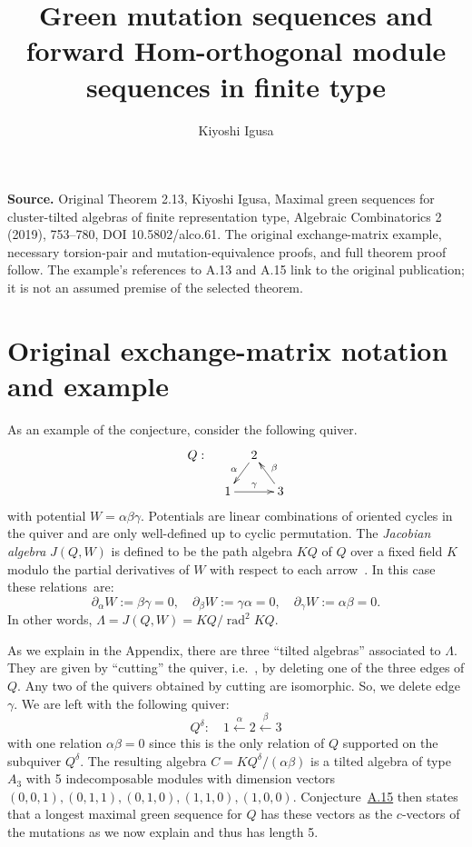 \documentclass[10pt]{amsart}
\title[Green mutation and Hom-orthogonality]{Green mutation sequences and forward Hom-orthogonal module sequences in finite type}
\author{Kiyoshi Igusa}
\date{}
\theoremstyle{definition}
\newcommand{\ie}{i.e.\ }
\DeclareMathOperator{\rad}{rad}
\begin{document}
\maketitle
\noindent\textbf{Source.} Original Theorem 2.13, Kiyoshi Igusa, Maximal green sequences for cluster-tilted algebras of finite representation type, Algebraic Combinatorics 2 (2019), 753--780, DOI 10.5802/alco.61. The original exchange-matrix example, necessary torsion-pair and mutation-equivalence proofs, and full theorem proof follow. The example's references to A.13 and A.15 link to the original publication; it is not an assumed premise of the selected theorem.
\section*{Original exchange-matrix notation and example}
As an example of the conjecture, consider the following quiver.
\[
\xymatrixrowsep{15pt}\xymatrixcolsep{10pt}
\xymatrix{%
Q:&& 2\ar[dl]_\alpha\\
&1\ar[rr]^\gamma &&3\ar[lu]_\beta
	}%
\]
with potential $W=\alpha\beta\gamma$. Potentials are linear combinations of oriented cycles in the quiver and are only well-defined up to cyclic permutation. The \emph{Jacobian algebra} $J(Q,W)$ is defined to be the path algebra $KQ$ of $Q$ over a fixed field $K$ modulo the partial derivatives of $W$ with respect to each arrow~\cite{DWZ1}. In this case these relations~are:
\[
	\partial_\alpha W:=\beta\gamma=0,\quad \partial_\beta W:=\gamma\alpha=0,\quad \partial_\gamma W:=\alpha\beta=0.
\]
In other words, $\Lambda=J(Q,W)=KQ/\rad ^2KQ$. 

As we explain in the Appendix, there are three ``tilted algebras'' associated to $\Lambda$. They are given by ``cutting'' the quiver, \ie, by deleting one of the three edges of $Q$. Any two of the quivers obtained by cutting are isomorphic. So, we delete edge $\gamma$. We are left with the following quiver:
\[
	Q^\delta:\quad 1\xleftarrow\alpha 2\xleftarrow\beta 3
\]
with one relation $\alpha\beta=0$ since this is the only relation of $Q$ supported on the subquiver $Q^\delta$. The resulting algebra $C=KQ^\delta/(\alpha\beta)$ is a tilted algebra of type $A_3$ with 5 indecomposable modules with dimension vectors $(0,0,1), (0,1,1), (0,1,0), (1,1,0), (1,0,0)$. Conjecture~\href{https://alco.centre-mersenne.org/articles/10.5802/alco.61/}{A.15} then states that a longest maximal green sequence for $Q$ has these vectors as the $c$-vectors of the mutations as we now explain and thus has length 5.
\end{document}

